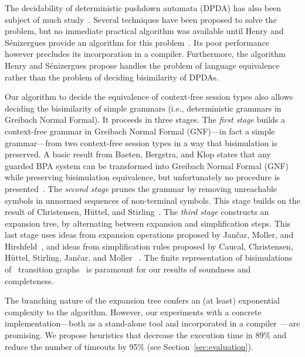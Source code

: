 
The decidability of deterministic pushdown automata (DPDA) has also been
subject of much
study~\cite{janvcar2008selected,senizergues1997equivalence,stirling2001decidability}.
Several techniques have been proposed to solve the problem, but no
immediate practical algorithm was available until Henry and
Sénizergues provide an algorithm for this
problem~\cite{henry2013lalblc}. Its poor performance however precludes
its incorporation in a compiler.
Furthermore, the algorithm Henry and
Sénizergues propose handles the problem of language equivalence rather than
the problem of deciding bisimilarity of DPDAs.

Our algorithm to decide the equivalence of context-free session types
also allows deciding the bisimilarity of simple grammars (i.e.,
deterministic grammars in Greibach Normal Formal).  It proceeds in
three stages.
%
The \emph{first stage} builds a context-free grammar in Greibach
Normal Formal (GNF)---in fact a simple grammar---from two context-free
session types in a way that bisimulation is preserved.  A basic result
from Baeten, Bergstra, and Klop states that any guarded BPA system can
be transformed into Greibach Normal Formal (GNF) while preserving
bisimulation equivalence, but unfortunately no procedure is
presented~\cite{baeten1993decidability}.
%
The \emph{second stage} prunes the grammar by removing unreachable
symbols in unnormed sequences of non-terminal symbols. This stage
builds on the result of Christensen, H\"uttel, and 
Stirling~\cite{DBLP:journals/iandc/ChristensenHS95}.
%
The \emph{third stage} constructs an expansion tree, by alternating
between expansion and simplification steps.  This last stage uses
ideas from expansion operations proposed by Jan\v car, Moller, and
Hirshfeld~\cite{hirshfeld1996bisimulation,janvcar1999techniques}, and
ideas from simplification rules proposed by Caucal, Christensen,
H\"uttel, Stirling, Jan\v car, and Moller
~\cite{caucal1986decidabilite,DBLP:journals/iandc/ChristensenHS95,janvcar1999techniques}.
The finite representation of bisimulations of \BPA\ transition
graphs~\cite{caucal1986decidabilite,DBLP:journals/iandc/ChristensenHS95}
is paramount for our results of soundness and completeness.


The branching nature of the expansion tree confers an (at least)
exponential complexity to the algorithm.
%
However, our experiments with a concrete implementation---both as a
stand-alone tool and incorporated in a
compiler~\cite{almeida.etal_freest-functional-language}---are promising.
We propose heuristics that decrease the execution time in 89\% and 
reduce the number of timeouts by 95\% (see Section~\ref{sec:evaluation}).

